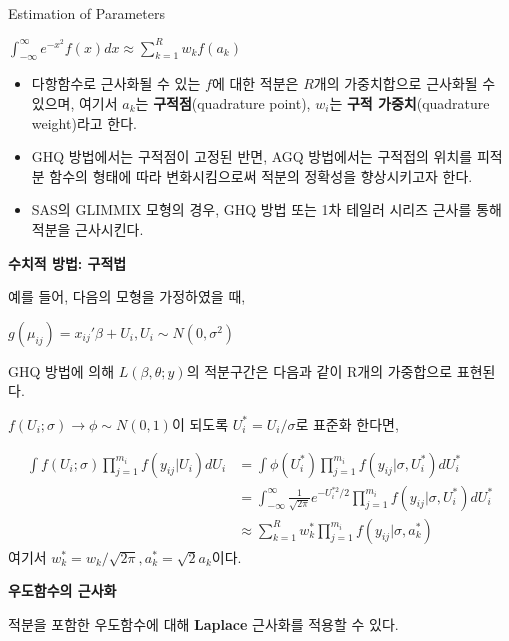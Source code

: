 \documentclass[9pt, xelatex]{beamer}
\begin{document}
{\begin{frame}[allowframebreaks]{Estimation of Parameters}
		\begin{center}
			$\int^{\infty}_{-\infty} e^{-x^{2}}f(x)dx \approx \sum^{R}_{k=1}w_{k}f(a_{k})$
		\end{center}
		
		\begin{itemize}
			\item 다항함수로 근사화될 수 있는 $f$에 대한 적분은 $R$개의 가중치합으로 근사화될 수 있으며, 여기서 $a_{k}$는 \textbf{구적점}(quadrature point), $w_{i}$는 \textbf{구적 가중치}(quadrature weight)라고 한다.
			\item GHQ 방법에서는 구적점이 고정된 반면, AGQ 방법에서는 구적접의 위치를 피적분 함수의 형태에 따라 변화시킴으로써 적분의 정확성을 향상시키고자 한다.
			\item SAS의 GLIMMIX 모형의 경우, GHQ 방법 또는 1차 테일러 시리즈 근사를 통해 적분을 근사시킨다.
		\end{itemize}
		\framebreak
		\textbf{수치적 방법: 구적법}
		\vspace{4mm}
		
		예를 들어, 다음의 모형을 가정하였을 때,
		\begin{center}
			$g(\mu_{ij})=x_{ij}'\beta+U_{i}, U_{i}\sim N(0,\sigma^{2})$
		\end{center}
		\vspace{2mm}
		GHQ 방법에 의해 $L(\beta,\theta; y)$의 적분구간은 다음과 같이 R개의 가중합으로 표현된다.
		\vspace{2mm}
		
		$f(U_{i};\sigma)\to\phi \sim N(0,1)$이 되도록 $U_{i}^{*}=U_{i}/\sigma$로 표준화 한다면,
		\begin{center}
			\begin{align}
				\int f(U_{i};\sigma)\prod_{j=1}^{m_{i}} f(y_{ij}|U_{i})dU_{i} & = \int \phi(U_{i}^{*})\prod_{j=1}^{m_{i}} f(y_{ij}|\sigma,U_{i}^{*})dU_{i}^{*} \\
				& = \int_{-\infty}^{\infty} \frac{1}{\sqrt{2\pi}}e^{-U_{i}^{*2}/2}\prod_{j=1}^{m_{i}} f(y_{ij}|\sigma,U_{i}^{*})dU_{i}^{*}\\
				& \approx \sum_{k=1}^{R}w_{k}^{*}\prod_{j=1}^{m_{i}} f(y_{ij}|\sigma,a_{k}^{*})
			\end{align}
			여기서 $w_{k}^{*}=w_{k}/\sqrt{2\pi}, a_{k}^{*}=\sqrt{2}a_{k}$이다.
		\end{center}
		
		
		\framebreak
		\textbf{우도함수의 근사화}
		\vspace{4mm}
		
		적분을 포함한 우도함수에 대해 \textbf{Laplace} 근사화를 적용할 수 있다.
		\vspace{2mm}
		

\end{frame}}
\end{document}
